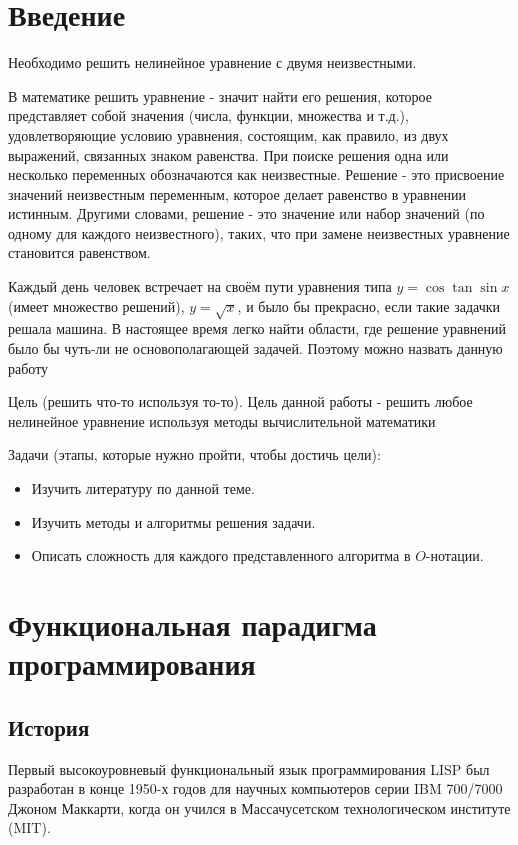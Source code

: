 \section*{Введение}
Необходимо решить нелинейное уравнение с двумя неизвестными.

В математике решить уравнение - значит найти его решения, которое представляет собой значения (числа, функции, множества и т.д.), удовлетворяющие условию уравнения, состоящим, как правило, из двух выражений, связанных знаком равенства.
При поиске решения одна или несколько переменных обозначаются как неизвестные. 
Решение - это присвоение значений неизвестным переменным, которое делает равенство в уравнении истинным.
Другими словами, решение - это значение или набор значений (по одному для каждого неизвестного), таких, что при замене неизвестных уравнение становится равенством. 

Каждый день человек встречает на своём пути уравнения типа $y=\cos{\tan{\sin{x}}}$ (имеет множество решений), $y=\sqrt{x}$, и было бы прекрасно, если такие задачки решала машина. В настоящее время легко найти области, где решение уравнений было бы чуть-ли не основополагающей задачей. Поэтому можно назвать данную работу 

Цель (решить что-то используя то-то).
Цель данной работы - решить любое нелинейное уравнение используя методы вычислительной математики

Задачи (этапы, которые нужно пройти, чтобы достичь цели):

\begin{itemize}
	\item Изучить литературу по данной теме.
	\item Изучить методы и алгоритмы решения задачи.
	\item Описать сложность для каждого представленного алгоритма в \(O\)-нотации.
\end{itemize}

\newpage
\section{Функциональная парадигма программирования}

\subsection{История}

Первый высокоуровневый функциональный язык программирования LISP был разработан в конце 1950-х годов для научных компьютеров серии IBM 700/7000 Джоном Маккарти, когда он учился в Массачусетском технологическом институте (MIT). \cite{HistoryofLISP}

